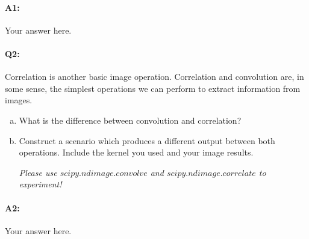 \paragraph{A1:} Your answer here.



\pagebreak
\paragraph{Q2:} Correlation is another basic image operation. Correlation and convolution are, in some sense, the simplest operations we can perform to extract information from images.
\begin{enumerate}[(a)]
    \item 
    What is the difference between convolution and correlation?

    \item
    Construct a scenario which produces a different output between both operations. Include the kernel you used and your image results.
    
    \emph{Please use \href{https://docs.scipy.org/doc/scipy/reference/generated/scipy.ndimage.convolve.html}{$scipy.ndimage.convolve$} and \href{https://docs.scipy.org/doc/scipy/reference/generated/scipy.ndimage.correlate.html}{$scipy.ndimage.correlate$} to experiment!}
    
\end{enumerate}


\paragraph{A2:} Your answer here.


